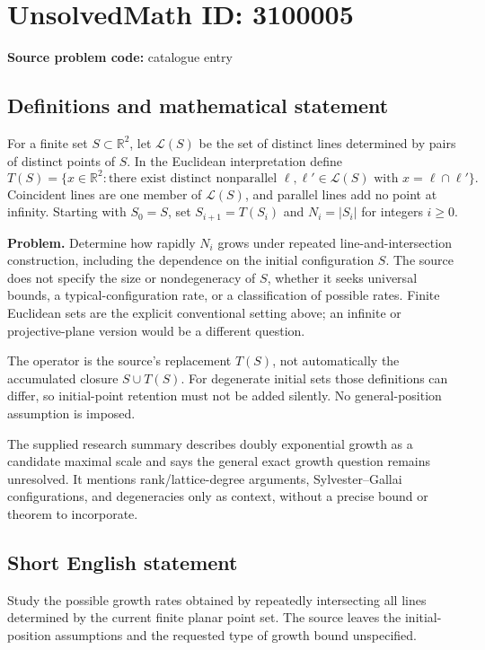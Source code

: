 \documentclass[11pt]{article}
\begin{document}
\section*{UnsolvedMath ID: 3100005}
\textbf{Source problem code:} catalogue entry
\subsection{Definitions and mathematical statement}
For a finite set $S\subset\mathbb R^2$, let $\mathcal L(S)$ be the set of distinct lines determined by pairs of distinct points of $S$. In the Euclidean interpretation define
\[
T(S)=\{x\in\mathbb R^2:\text{there exist distinct nonparallel }
\ell,\ell'\in\mathcal L(S)\text{ with }x=\ell\cap\ell'\}.
\]
Coincident lines are one member of $\mathcal L(S)$, and parallel lines add no point at infinity. Starting with $S_0=S$, set $S_{i+1}=T(S_i)$ and $N_i=|S_i|$ for integers $i\geq0$.

\textbf{Problem.} Determine how rapidly $N_i$ grows under repeated line-and-intersection construction, including the dependence on the initial configuration $S$. The source does not specify the size or nondegeneracy of $S$, whether it seeks universal bounds, a typical-configuration rate, or a classification of possible rates. Finite Euclidean sets are the explicit conventional setting above; an infinite or projective-plane version would be a different question.

The operator is the source's replacement $T(S)$, not automatically the accumulated closure $S\cup T(S)$. For degenerate initial sets those definitions can differ, so initial-point retention must not be added silently. No general-position assumption is imposed.

The supplied research summary describes doubly exponential growth as a candidate maximal scale and says the general exact growth question remains unresolved. It mentions rank/lattice-degree arguments, Sylvester--Gallai configurations, and degeneracies only as context, without a precise bound or theorem to incorporate.
\subsection{Short English statement}
Study the possible growth rates obtained by repeatedly intersecting all lines determined by the current finite planar point set. The source leaves the initial-position assumptions and the requested type of growth bound unspecified.
\end{document}
